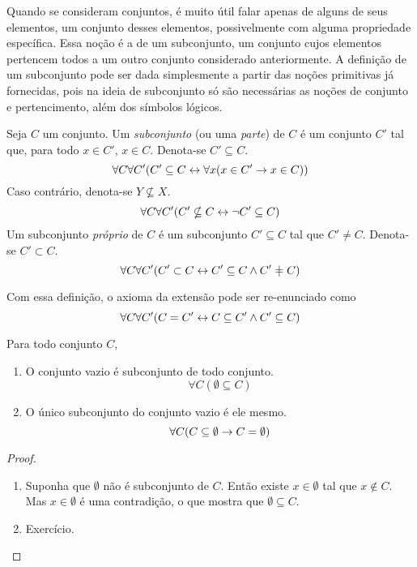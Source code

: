 Quando se consideram conjuntos, é muito útil falar apenas de alguns de seus elementos, um conjunto desses elementos, possivelmente com alguma propriedade específica. Essa noção é a de um subconjunto, um conjunto cujos elementos pertencem todos a um outro conjunto considerado anteriormente. A definição de um subconjunto pode ser dada simplesmente a partir das noções primitivas já fornecidas, pois na ideia de subconjunto só são necessárias as noções de conjunto e pertencimento, além dos símbolos lógicos.

\begin{definition}
Seja $C$ um conjunto. Um \emph{subconjunto} (ou uma \emph{parte}) de $C$ é um conjunto $C'$ tal que, para todo $x \in C'$, $x \in C$. Denota-se $C' \subseteq C$.
	\begin{equation*}
	\forall C \forall C' (C' \subseteq C \leftrightarrow \forall x (x \in C' \rightarrow x \in C))
	\end{equation*}
Caso contrário, denota-se $Y \nsubseteq X$.
	\begin{equation*}
	\forall C \forall C' (C' \nsubseteq C \leftrightarrow \lnot C' \subseteq C)
	\end{equation*}
Um subconjunto \emph{próprio} de $C$ é um subconjunto $C' \subseteq C$ tal que $C' \neq C$. Denota-se $C' \subset C$.
	\begin{equation*}
	\forall C \forall C' (C' \subset C \lequiv C' \subseteq C \lee C' \neq C)
	\end{equation*}
\end{definition}

Com essa definição, o axioma da extensão pode ser re-enunciado como
	\begin{equation*}
	\forall C \forall C' (C = C' \leftrightarrow C \subseteq C' \land C' \subseteq C)
	\end{equation*}

\begin{proposition}
Para todo conjunto $C$,
	\begin{enumerate}
	\item O conjunto vazio é subconjunto de todo conjunto.
		\begin{equation*}
		\forall C(\emptyset \subseteq C)
		\end{equation*}
	\item O único subconjunto do conjunto vazio é ele mesmo.
		\begin{equation*}
		\forall C(C \subseteq \emptyset \rightarrow C = \emptyset)
		\end{equation*}
	\end{enumerate}
\end{proposition}
\begin{proof}
	\begin{enumerate}
	\item Suponha que $\emptyset$ não é subconjunto de $C$. Então existe $x \in \emptyset$ tal que $x \notin C$. Mas $x \in \emptyset$ é uma contradição, o que mostra que $\emptyset \subseteq C$.

	\item Exercício.
	\end{enumerate}
\end{proof}

